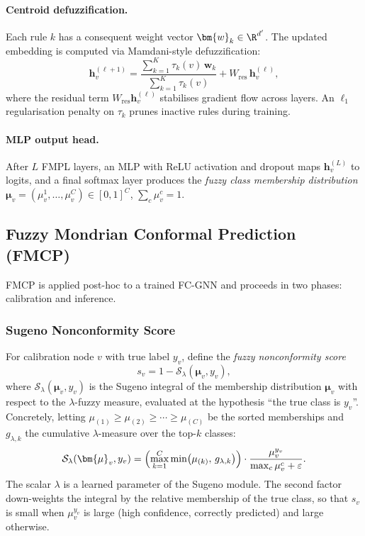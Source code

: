 \paragraph{Centroid defuzzification.}
Each rule $k$ has a consequent weight vector $\bm{w}_k \in \R^{d'}$.
The updated embedding is computed via Mamdani-style defuzzification:
\[
  \bm{h}_v^{(\ell+1)}
  = \frac{\sum_{k=1}^K \tau_k(v)\, \bm{w}_k}{\sum_{k=1}^K \tau_k(v)}
    + W_\text{res}\,\bm{h}_v^{(\ell)},
\]
where the residual term $W_\text{res}\bm{h}_v^{(\ell)}$ stabilises
gradient flow across layers.
An $\ell_1$ regularisation penalty on $\tau_k$ prunes inactive rules during
training.

\paragraph{MLP output head.}
After $L$ FMPL layers, an MLP with ReLU activation and dropout maps
$\bm{h}_v^{(L)}$ to logits, and a final softmax layer produces the
\emph{fuzzy class membership distribution}
$\bm{\mu}_v = (\mu_v^1, \ldots, \mu_v^C) \in [0,1]^C$,
$\sum_c \mu_v^c = 1$.

\subsection{Fuzzy Mondrian Conformal Prediction (FMCP)}
\label{sec:fmcp}

FMCP is applied post-hoc to a trained FC-GNN and proceeds in two phases:
calibration and inference.

\subsubsection{Sugeno Nonconformity Score}

For calibration node $v$ with true label $y_v$, define the
\emph{fuzzy nonconformity score}
\[
  s_v = 1 - \mathcal{S}_\lambda(\bm{\mu}_v, y_v),
\]
where $\mathcal{S}_\lambda(\bm{\mu}_v, y_v)$ is the Sugeno integral of the
membership distribution $\bm{\mu}_v$ with respect to the $\lambda$-fuzzy
measure, evaluated at the hypothesis ``the true class is $y_v$''.
Concretely, letting $\mu_{(1)} \ge \mu_{(2)} \ge \cdots \ge \mu_{(C)}$
be the sorted memberships and $g_{\lambda,k}$ the cumulative $\lambda$-measure
over the top-$k$ classes:
\[
  \mathcal{S}_\lambda(\bm{\mu}_v, y_v)
  = \Bigl(\max_{k=1}^C \min\bigl(\mu_{(k)},\, g_{\lambda,k}\bigr)\Bigr)
    \cdot \frac{\mu_v^{y_v}}{\max_c \mu_v^c + \varepsilon}.
\]
The scalar $\lambda$ is a learned parameter of the Sugeno module.
The second factor down-weights the integral by the relative membership of
the true class, so that $s_v$ is small when $\mu_v^{y_v}$ is large
(high confidence, correctly predicted) and large otherwise.

